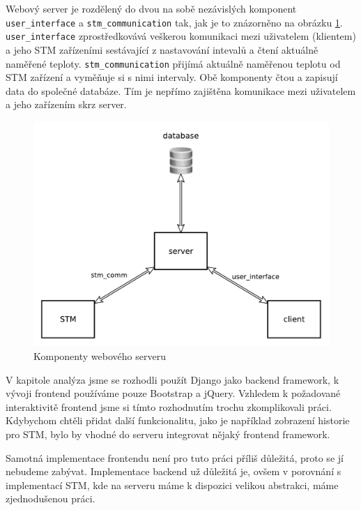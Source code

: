 
Webový server je rozdělený do dvou na sobě nezávislých komponent \\ \texttt{user\_interface} a
\texttt{stm\_communication} tak, jak je to znázorněno na obrázku \ref{server-overview}.
\texttt{user\_interface} zprostředkovává veškerou komunikaci mezi uživatelem (klientem) a jeho STM
zařízeními sestávající z nastavování intevalů a čtení aktuálně naměřené teploty.
\texttt{stm\_communication} přijímá aktuálně naměřenou teplotu od STM zařízení a vyměňuje si s nimi intervaly.
Obě komponenty čtou a zapisují data do společné databáze.
Tím je nepřímo zajištěna komunikace mezi uživatelem a jeho zařízením skrz server.

\begin{figure}[tbh]\centering
\includegraphics[scale=0.6]{../img/server_overview.pdf}
\caption{Komponenty webového serveru}
\label{server-overview}
\end{figure}

V kapitole analýza jsme se rozhodli použít Django jako backend framework, k vývoji frontend
používáme pouze Bootstrap a jQuery.
Vzhledem k požadované interaktivitě frontend jsme si tímto rozhodnutím trochu zkomplikovali práci.
Kdybychom chtěli přidat další funkcionalitu, jako je například zobrazení historie pro STM,
bylo by vhodné do serveru integrovat nějaký frontend framework.

Samotná implementace frontendu není pro tuto práci příliš důležitá, proto se jí nebudeme zabývat.
Implementace backend už důležitá je, ovšem v porovnání s implementací STM, kde na serveru máme
k dispozici velikou abstrakci, máme zjednodušenou práci.

